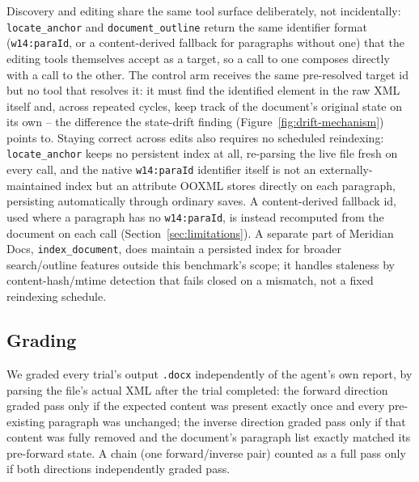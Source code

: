 \documentclass[11pt]{article}
\DeclareRobustCommand{\claim}[2]{#2}
\begin{document}
Discovery and editing share the same tool surface deliberately, not incidentally:
\claim{anchor-id-stability}{\texttt{locate\_anchor} and \texttt{document\_outline} return the same identifier format
(\texttt{w14:paraId}, or a content-derived fallback for paragraphs without one) that the editing
tools themselves accept as a target,} so a call to one composes directly with a call to the
other. \claim{anchors-pre-resolved-no-discovery}{\claim{fresh-anchor-resolution-mechanism}{The control arm receives the same pre-resolved target id but no tool that resolves it: it
must find the identified element in the raw XML itself and, across repeated cycles, keep track of
the document's original state on its own --
\claim{state-drift-generic-degrades}{the difference the state-drift finding
(Figure~\ref{fig:drift-mechanism}) points to.}}} Staying correct across edits also requires no
scheduled reindexing: \texttt{locate\_anchor} keeps no persistent index
at all, re-parsing the live file fresh on every call, and \claim{anchor-id-stability}{the native \texttt{w14:paraId}
identifier itself is not an externally-maintained index but an attribute OOXML stores directly on
each paragraph, persisting automatically through ordinary saves. A content-derived fallback id,
used where a paragraph has no \texttt{w14:paraId}, is instead recomputed from the document on each
call (Section~\ref{sec:limitations}).} \claim{indexing-tools-out-of-scope}{\claim{anchoredit-subset-scope}{A separate part of Meridian
Docs, \texttt{index\_document}, does maintain a persisted index for broader search/outline
features outside this benchmark's scope};} it handles staleness by content-hash/mtime detection
that fails closed on a mismatch, not a fixed reindexing schedule.

\subsection{Grading}
\claim{grading-external-from-docx}{We graded every trial's output \texttt{.docx} independently of the agent's own report, by
parsing the file's actual XML after the trial completed:} \claim{grading-exact-order-vs-order-blind}{the forward direction graded pass only
if the expected content was present exactly once and every pre-existing paragraph was unchanged;
the inverse direction graded pass only if that content was fully removed and the document's
paragraph list exactly matched its pre-forward state.} \claim{forward-inverse-chain-pass}{A chain (one forward/inverse pair) counted
as a full pass only if both directions independently graded pass.}
\end{document}

